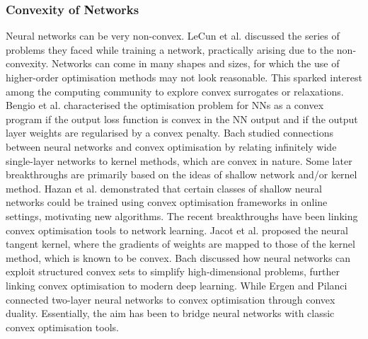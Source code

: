 \documentclass{article}
\begin{document}
\subsubsection{Convexity of Networks}
\label{convexity}
Neural networks can be very non-convex. LeCun et al. \cite{lecun2002efficient} discussed the series of problems they faced while training a network, practically arising due to the non-convexity. Networks can come in many shapes and sizes, for which the use of higher-order optimisation methods may not look reasonable. This sparked interest among the computing community to explore convex surrogates or relaxations. Bengio et al. \cite{greedyLayerWise} characterised the optimisation problem for NNs as a convex program if the output loss function is convex in the NN output and if the output layer weights are regularised by a convex penalty. Bach \cite{bach2008consistency} studied connections between neural networks and convex optimisation by relating infinitely wide single-layer networks to kernel methods, which are convex in nature. Some later breakthroughs are primarily based on the ideas of shallow network and/or kernel method. Hazan et al. \cite{hazan2015beyond} demonstrated that certain classes of shallow neural networks could be trained using convex optimisation frameworks in online settings, motivating new algorithms. The recent breakthroughs have been linking convex optimisation tools to network learning. Jacot et al. \cite{jacot2018neural} proposed the neural tangent kernel, where the gradients of weights are mapped to those of the kernel method, which is known to be convex. Bach \cite{bach2017breaking} discussed how neural networks can exploit structured convex sets to simplify high-dimensional problems, further linking convex optimisation to modern deep learning. While Ergen and Pilanci \cite{ergen2021revealing} connected two-layer neural networks to convex optimisation through convex duality. Essentially, the aim has been to bridge neural networks with classic convex optimisation tools. 
\end{document}
